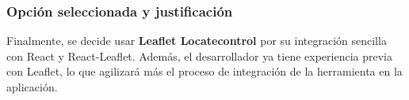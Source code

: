 \subsubsection{Opción seleccionada y justificación}
Finalmente, se decide usar \textbf{Leaflet Locatecontrol} por su integración sencilla con React y React-Leaflet. Además, el desarrollador ya tiene experiencia previa con Leaflet, lo que agilizará más el proceso de integración de la herramienta en la aplicación\cite{leafletLocateControl2023}.


